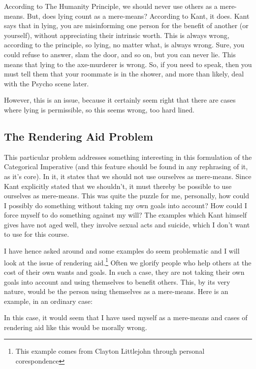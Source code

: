 According to The Humanity Principle, we should never use others as a mere-means. But, does lying count as a mere-means? According to Kant, it does. Kant says that in lying, you are misinforming one person for the benefit of another (or yourself), without appreciating their intrinsic worth. This is always wrong, according to the principle, so lying, no matter what, is always wrong. Sure, you could refuse to answer, slam the door, and so on, but you can never lie. This means that lying to the axe-murderer is wrong. So, if you need to speak, then you must tell them that your roommate is in the shower, and more than likely, deal with the Psycho scene later. 

However, this is an issue, because it certainly seem right that there are cases where lying is permissible, so this seems wrong, too hard lined. 

\subsection{The Rendering Aid Problem}

This particular problem addresses something interesting in this formulation of the Categorical Imperative (and this feature should be found in any rephrasing of it, as it's core). In it, it states that we should not use ourselves as mere-means. Since Kant explicitly stated that we shouldn't, it must thereby be possible to use ourselves as mere-means. This was quite the puzzle for me, personally, how could I possibly do something without taking my own goals into account? How could I force myself to do something against my will? The examples which Kant himself gives have not aged well, they involve sexual acts and suicide, which I don't want to use for this course. 

I have hence asked around and some examples do seem problematic and I will look at the issue of rendering aid.\footnote{This example comes from Clayton Littlejohn through personal corespondence} Often we glorify people who help others at the cost of their own wants and goals. In such a case, they are not taking their own goals into account and using themselves to benefit others. This, by its very nature, would be the person using themselves as a mere-means. Here is an example, in an ordinary case:



In this case, it would seem that I have used myself as a mere-means and cases of rendering aid like this would be morally wrong.